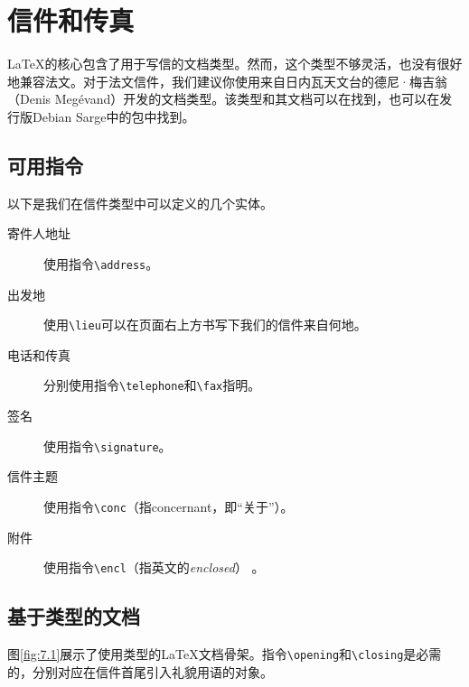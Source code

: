 \section{信件和传真}

\LaTeX 的核心包含了用于写信的文档类型。然而，这个类型不够灵活，也没有很好地兼容\linebreak 法文。对于法文信件，我们建议你使用来自日内瓦天文台的德尼·梅吉翁（Denis Megévand）开发的文档类型。该类型和其文档可以在找到，也可以在发行版Debian Sarge中的包中找到。

\subsection{可用指令}

以下是我们在信件类型中可以定义的几个实体。

\begin{description}
    \item[寄件人地址] 使用指令\verb|\address|。
    \item[出发地] 使用\verb|\lieu|可以在页面右上方书写下我们的信件来自何地。
    \item[电话和传真] 分别使用指令\verb|\telephone|和\verb|\fax|指明。
    \item[签名] 使用指令\verb|\signature|。
    \item[信件主题] 使用指令\verb|\conc|（指concernant，即“关于”）。
    \item[附件] 使用指令\verb|\encl|（指英文的\emph{enclosed}） 。
\end{description}

\subsection{基于类型的文档}

图\ref{fig:7.1}展示了使用类型的\LaTeX 文档骨架。指令\verb|\opening|和\verb|\closing|是必需的，分别对应在信件首尾引入礼貌用语的对象。

